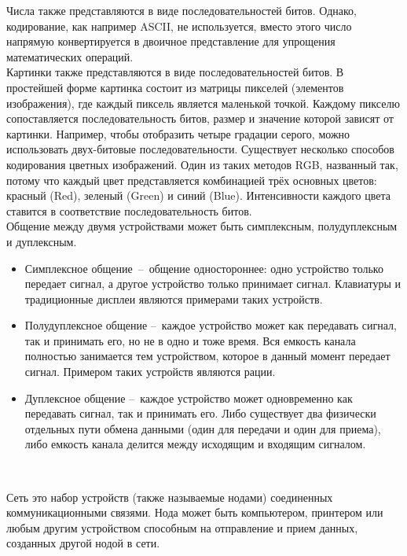 Числа также представляются в виде последовательностей битов. Однако, кодирование, как например ASCII, не используется, вместо этого число напрямую конвертируется в двоичное представление для упрощения математических операций. \\

Картинки также представляются в виде последовательностей битов. В простейшей форме картинка состоит из матрицы пикселей (элементов изображения), где каждый пиксель является маленькой точкой. Каждому пикселю сопоставляется последовательность битов, размер и значение которой зависят от картинки. Например, чтобы отобразить четыре градации серого, можно использовать двух-битовые последовательности. Существует несколько способов кодирования цветных изображений. Один из таких методов RGB, названный так, потому что каждый цвет представляется комбинацией трёх основных цветов: красный (Red), зеленый (Green) и синий (Blue). Интенсивности каждого цвета ставится в соответствие последовательность битов. \\ 

Общение между двумя устройствами может быть симплексным, полудуплексным и дуплексным. \\

\begin{itemize}
  \item Симплексное общение – общение одностороннее: одно устройство только передает сигнал, а другое устройство только принимает сигнал. Клавиатуры и традиционные дисплеи являются примерами таких устройств.
  \item Полудуплексное общение – каждое устройство может как передавать сигнал, так и принимать его, но не в одно и тоже время. Вся емкость канала полностью занимается тем устройством, которое в данный момент передает сигнал. Примером таких устройств являются рации.
  \item Дуплексное общение – каждое устройство может одновременно как передавать сигнал, так и принимать его. Либо существует два физически отдельных пути обмена данными (один для передачи и один для приема), либо емкость канала делится между исходящим и входящим сигналом.
\end{itemize}
\

Сеть это набор устройств (также называемые нодами) соединенных коммуникационными связями. Нода может быть компьютером, принтером или любым другим устройством способным на отправление и прием данных, созданных другой нодой в сети.


